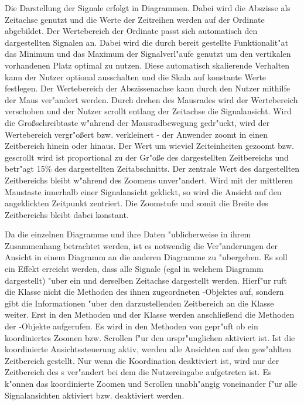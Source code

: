 Die Darstellung der Signale erfolgt in Diagrammen.
Dabei wird die Abszisse als Zeitachse genutzt und die Werte der Zeitreihen werden auf der Ordinate abgebildet.
Der Wertebereich der Ordinate passt sich automatisch den dargestellten Signalen an.
Dabei wird die durch \jfc bereit gestellte Funktionalit"at das Minimum und das Maximum der Signalverl"aufe genutzt um den vertikalen vorhandenen Platz optimal zu nutzen.
Diese automatisch skalierende Verhalten kann der Nutzer optional ausschalten und die Skala auf konstante Werte festlegen.
Der Wertebereich der Abszissenachse kann durch den Nutzer mithilfe der Maus ver"andert werden.
Durch drehen des Mausrades wird der Wertebereich verschoben und der Nutzer scrollt entlang der Zeitachse die Signalansicht.
Wird die Gro{\ss}schreibtaste w"ahrend der Mausradbewegung gedr"uckt, wird der Wertebereich vergr"o{\ss}ert bzw. verkleinert - der Anwender zoomt in einen Zeitbereich hinein oder hinaus.
Der Wert um wieviel Zeiteinheiten gezoomt bzw. gescrollt wird ist proportional zu der Gr"o{\ss}e des dargestellten Zeitbereichs und betr"agt \unit{15}{\%} des dargestellten Zeitabschnitts.
Der zentrale Wert des dargestellten Zeitbereichs bleibt w"ahrend des Zoomens unver"andert.
Wird mit der mittleren Maustaste innerhalb einer Signalansicht geklickt, so wird die Ansicht auf den angeklickten Zeitpunkt zentriert.
Die Zoomstufe und somit die Breite des Zeitbereichs bleibt dabei konstant.

Da die einzelnen Diagramme und ihre Daten "ublicherweise in ihrem Zusammenhang betrachtet werden, ist es notwendig die Ver"anderungen der Ansicht in einem Diagramm an die anderen Diagramme zu "ubergeben.
Es soll ein Effekt erreicht werden, dass alle Signale (egal in welchem Diagramm dargestellt) "uber ein und derselben Zeitachse dargestellt werden.
Hierf"ur ruft die Klasse  nicht die Methoden des ihnen zugeordneten -Objektes auf, sondern gibt die Informationen "uber den darzustellenden Zeitbereich an die Klasse  weiter.
Erst in den Methoden  und  der Klasse  werden anschlie{\ss}end die Methoden der -Objekte aufgerufen.
Es wird in den Methoden von  gepr"uft ob ein koordiniertes Zoomen bzw. Scrollen f"ur den urspr"unglichen  aktiviert ist.
Ist die koordinierte Ansichtssteuerung aktiv, werden alle Ansichten auf den gew"ahlten Zeitbereich gestellt.
Nur wenn die Koordination deaktiviert ist, wird nur der Zeitbereich des s ver"andert bei dem die Nutzereingabe aufgetreten ist.
Es k"onnen das koordinierte Zoomen und Scrollen unabh"angig voneinander f"ur alle Signalansichten aktiviert bzw. deaktiviert werden.

